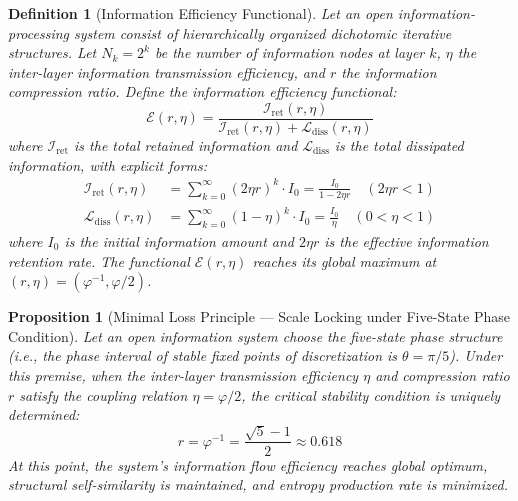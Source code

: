 \documentclass[12pt,a4paper,twocolumn]{article}
\renewcommand{\phi}{\varphi}
\newtheorem{proposition}[theorem]{Proposition}
\newtheorem{definition}[theorem]{Definition}
\begin{document}
\begin{definition}[Information Efficiency Functional]
Let an open information-processing system consist of hierarchically organized dichotomic iterative structures. Let $N_k = 2^k$ be the number of information nodes at layer $k$, $\eta$ the inter-layer information transmission efficiency, and $r$ the information compression ratio. Define the information efficiency functional:
\begin{equation}
\mathcal{E}(r,\eta) = \frac{\mathcal{I}_{\text{ret}}(r,\eta)}{\mathcal{I}_{\text{ret}}(r,\eta) + \mathcal{L}_{\text{diss}}(r,\eta)}
\end{equation}
where $\mathcal{I}_{\text{ret}}$ is the total retained information and $\mathcal{L}_{\text{diss}}$ is the total dissipated information, with explicit forms:
\begin{align}
\mathcal{I}_{\text{ret}}(r,\eta) &= \sum_{k=0}^{\infty} (2\eta r)^k \cdot I_0 = \frac{I_0}{1 - 2\eta r} \quad (2\eta r < 1) \\
\mathcal{L}_{\text{diss}}(r,\eta) &= \sum_{k=0}^{\infty} (1-\eta)^k \cdot I_0 = \frac{I_0}{\eta} \quad (0 < \eta < 1)
\end{align}
where $I_0$ is the initial information amount and $2\eta r$ is the effective information retention rate. The functional $\mathcal{E}(r,\eta)$ reaches its global maximum at $(r,\eta)=(\phi^{-1},\phi/2)$.
\end{definition}

\begin{proposition}[Minimal Loss Principle --- Scale Locking under Five-State Phase Condition]
\label{prop:min_loss}
Let an open information system choose the five-state phase structure (i.e., the phase interval of stable fixed points of discretization is $\theta = \pi/5$). Under this premise, when the inter-layer transmission efficiency $\eta$ and compression ratio $r$ satisfy the coupling relation $\eta = \phi/2$, the critical stability condition is uniquely determined:
\begin{equation}
r = \phi^{-1} = \frac{\sqrt{5}-1}{2} \approx 0.618
\end{equation}
At this point, the system's information flow efficiency reaches global optimum, structural self-similarity is maintained, and entropy production rate is minimized.
\end{proposition}
\end{document}
